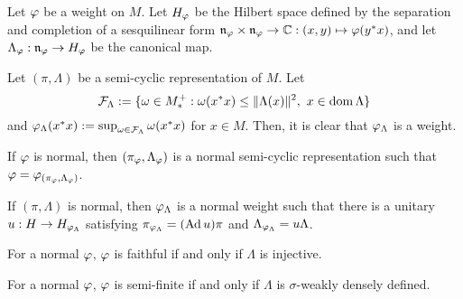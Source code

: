 \documentclass{../../../small}
\begin{document}
\begin{prop}
Let $\varphi$ be a weight on $M$.
Let $H_\varphi$ be the Hilbert space defined by the separation and completion of a sesquilinear form $\mathfrak{n}_\varphi\times\mathfrak{n}_\varphi\to\mathbb{C}:(x,y)\mapsto\varphi(y^*x)$, and let $\Lambda_\varphi:\mathfrak{n}_\varphi\to H_\varphi$ be the canonical map.

Let $(\pi,\Lambda)$ be a semi-cyclic representation of $M$.
Let
\[\mathcal{F}_\Lambda:=\{\omega\in M_*^+:\omega(x^*x)\le\|\Lambda(x)\|^2,\ x\in\operatorname{dom}\Lambda\}\]
and $\varphi_\Lambda(x^*x):=\sup_{\omega\in\mathcal{F}_\Lambda}\omega(x^*x)$ for $x\in M$.
Then, it is clear that $\varphi_\Lambda$ is a weight.
\begin{parts}
\item If $\varphi$ is normal, then $(\pi_\varphi,\Lambda_\varphi)$ is a normal semi-cyclic representation such that $\varphi=\varphi_{(\pi_\varphi,\Lambda_\varphi)}$.
\item If $(\pi,\Lambda)$ is normal, then $\varphi_\Lambda$ is a normal weight such that there is a unitary $u:H\to H_{\varphi_\Lambda}$ satisfying $\pi_{\varphi_\Lambda}=(\operatorname{Ad} u)\pi$ and $\Lambda_{\varphi_\Lambda}=u\Lambda$.
\item For a normal $\varphi$, $\varphi$ is faithful if and only if $\Lambda$ is injective.
\item For a normal $\varphi$, $\varphi$ is semi-finite if and only if $\Lambda$ is $\sigma$-weakly densely defined.
\end{parts}
\end{prop}
\end{document}
